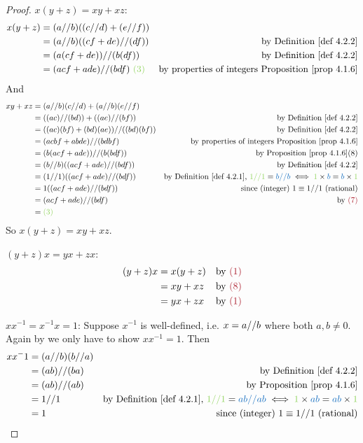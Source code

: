 \begin{proof}
 \(x(y + z) = xy + xz\):
\begin{align*}
    x(y + z) & = (a \D b)((c \D d) + (e \D f)) \\
             & = (a \D b)((cf + de) \D (df)) & \text{by \DEF{4.2.2}} \\
             & = (a(cf + de)) \D (b(df)) & \text{by \DEF{4.2.2}} \\
             & = (acf + ade) \D (bdf) \GREEN{\ (3)} & \text{by properties of integers \PROP{4.1.6}}
\end{align*}
And
\begin{align*}
    xy + xz & = (a \D b)(c \D d) + (a \D b)(e \D f) \\
            & = ((ac) \D (bd)) + ((ae) \D (bf)) & \text{by \DEF{4.2.2}} \\
            & = ((ac)(bf) + (bd)(ae)) \D ((bd)(bf)) & \text{by \DEF{4.2.2}} \\
            & = (acbf + abde) \D (bdbf) & \text{by properties of integers \PROP{4.1.6}} \\
            & = (b(acf + ade)) \D (b(bdf)) & \text{by \PROP{4.1.6}(8)} \\
            & = (b \D b)((acf + ade) \D (bdf)) & \text{by \DEF{4.2.2}} \\
            & = (1 \D 1)((acf + ade) \D (bdf)) & \text{by \DEF{4.2.1}, \(\GREEN{1 \D 1} = \BLUE{b \D b} \iff \GREEN{1} \X \BLUE{b} = \BLUE{b} \X \GREEN{1} \)} \\
            & = 1((acf + ade) \D (bdf)) & \text{since (integer) \(1 \equiv 1 \D 1\) (rational)} \\
            & = (acf + ade) \D (bdf) & \text{by \MAROON{(7)}} \\
            & = \GREEN{(3)}
\end{align*}
So \(x(y + z) = xy + xz\).

 \((y + z)x = yx + zx\):
\begin{align*}
    (y + z)x & = x(y + z) & \text{by \MAROON{(1)}} \\
             & = xy + xz & \text{by \MAROON{(8)}} \\
             & = yx + zx & \text{by \MAROON{(1)}}
\end{align*}

 \(xx^{-1} = x^{-1}x = 1\):
Suppose \(x^{-1}\) is well-defined, i.e. \(x = a \text{//} b\) where both \(a, b \neq 0\).
Again by  we only have to show \(xx^{-1} = 1\).
Then
\begin{align*}
    xx^-1 & = (a \D b)(b \D a) \\
          & = (ab) \D (ba) & \text{by \DEF{4.2.2}} \\
          & = (ab) \D (ab) & \text{by \PROP{4.1.6}} \\
          & = 1 \D 1 & \text{by \DEF{4.2.1}, \(\GREEN{1 \D 1} = \BLUE{ab \D ab} \iff \GREEN{1} \X \BLUE{ab} = \BLUE{ab} \X \GREEN{1} \)} \\
          & = 1 & \text{since (integer) \(1 \equiv 1 \D 1\) (rational)}
\end{align*}
\end{proof}

